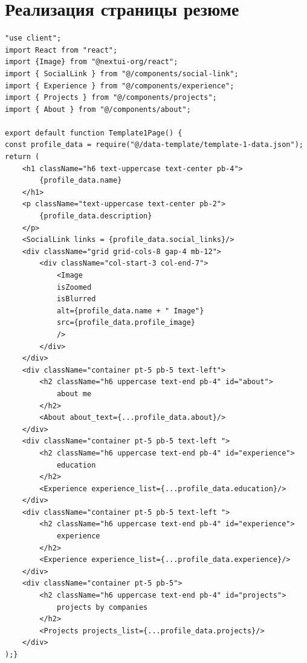 \documentclass[master, och, pract]{SCWorks}
\begin{document}
\section{Реализация страницы резюме}
\begin{verbatim}
"use client";
import React from "react";
import {Image} from "@nextui-org/react";
import { SocialLink } from "@/components/social-link";
import { Experience } from "@/components/experience";
import { Projects } from "@/components/projects";
import { About } from "@/components/about";

export default function Template1Page() {
const profile_data = require("@/data-template/template-1-data.json");
return (
    <h1 className="h6 text-uppercase text-center pb-4">
        {profile_data.name}
    </h1>
    <p className="text-uppercase text-center pb-2">
        {profile_data.description}
    </p>
    <SocialLink links = {profile_data.social_links}/>
    <div className="grid grid-cols-8 gap-4 mb-12">
        <div className="col-start-3 col-end-7">
            <Image
            isZoomed
            isBlurred
            alt={profile_data.name + " Image"}
            src={profile_data.profile_image}
            />
        </div>
    </div>
    <div className="container pt-5 pb-5 text-left">
        <h2 className="h6 uppercase text-end pb-4" id="about">
            about me
        </h2>
        <About about_text={...profile_data.about}/>
    </div>
    <div className="container pt-5 pb-5 text-left ">
        <h2 className="h6 uppercase text-end pb-4" id="experience">
            education
        </h2>
        <Experience experience_list={...profile_data.education}/>
    </div>
    <div className="container pt-5 pb-5 text-left ">
        <h2 className="h6 uppercase text-end pb-4" id="experience">
            experience
        </h2>
        <Experience experience_list={...profile_data.experience}/>
    </div>
    <div className="container pt-5 pb-5">
        <h2 className="h6 uppercase text-end pb-4" id="projects">
            projects by companies
        </h2>
        <Projects projects_list={...profile_data.projects}/>
    </div>
);}    
\end{verbatim}
\end{document}
